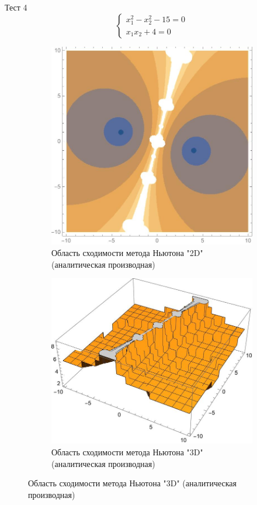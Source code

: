 \documentclass[12pt, a4paper]{article}
\begin{document}
	
	
	\centering	
	\newpage
		Тест 4
	\[
	\begin{cases}
		x_1^2-x_2^2-15=0\\
		x_1x_2+4=0
	\end{cases}
	\]
	
	
	\begin{figure}[H]
		\centering
		\begin{subfigure}{0.45\textwidth}
			\includegraphics[width=\textwidth]{2D4}
			\caption{Область сходимости метода Ньютона "2D" (аналитическая производная)}
		\end{subfigure}
		\hfill
		\begin{subfigure}{0.45\textwidth}
			\includegraphics[width=\textwidth]{3D4}
			\caption{Область сходимости метода Ньютона "3D" (аналитическая производная)}
		\end{subfigure}
	\end{figure}
\end{document}
